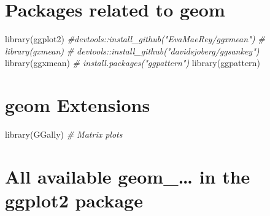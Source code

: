 \documentclass[
]{book}
\newenvironment{Shaded}{\begin{snugshade}}{\end{snugshade}}
\newcommand{\CommentTok}[1]{\textcolor[rgb]{0.56,0.35,0.01}{\textit{#1}}}
\newcommand{\FunctionTok}[1]{\textcolor[rgb]{0.00,0.00,0.00}{#1}}
\newcommand{\NormalTok}[1]{#1}
\begin{document}
\hypertarget{packages-related-to-geom}{%
\section{Packages related to geom}\label{packages-related-to-geom}}

\begin{Shaded}
\begin{Highlighting}[]
\FunctionTok{library}\NormalTok{(ggplot2)}
\CommentTok{\#devtools::install\_github("EvaMaeRey/ggxmean")}
\CommentTok{\# library(gxmean)}
\CommentTok{\# devtools::install\_github("davidsjoberg/ggsankey")}
\FunctionTok{library}\NormalTok{(ggxmean)}
\CommentTok{\# install.packages("ggpattern")}
\FunctionTok{library}\NormalTok{(ggpattern)}
\end{Highlighting}
\end{Shaded}

\hypertarget{geom-extensions}{%
\section{geom Extensions}\label{geom-extensions}}

\begin{Shaded}
\begin{Highlighting}[]
\FunctionTok{library}\NormalTok{(GGally) }\CommentTok{\# Matrix plots}
\end{Highlighting}
\end{Shaded}

\hypertarget{all-available-geom_-in-the-ggplot2-package}{%
\section{All available geom\_\ldots{} in the ggplot2 package}\label{all-available-geom_-in-the-ggplot2-package}}
\end{document}

